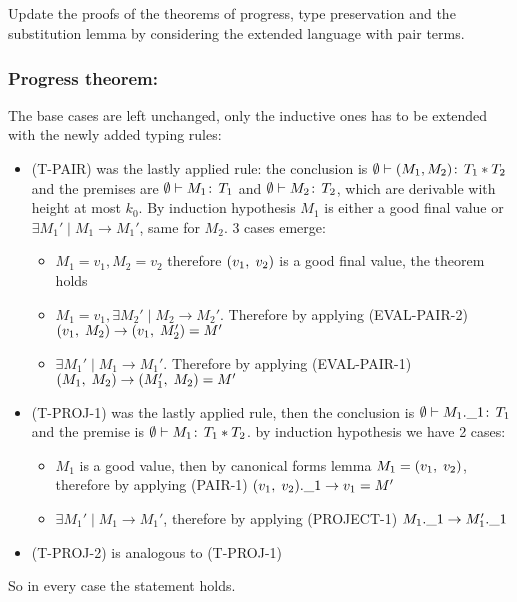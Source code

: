 \subsection{}
Update the proofs of the theorems of progress, type preservation and
the substitution lemma by considering the extended language with pair
terms.

\subsubsection*{Progress theorem:}

The base cases are left unchanged, only the inductive ones has to be
extended with the newly added typing rules:
\begin{itemize}
\item (T-PAIR) was the lastly applied rule: the conclusion is
  \(\emptyset \vdash (M_1, M_2) \!:\,T_1 * T_2\) and the premises
  are \(\emptyset \vdash M_1 \!:\,T_1\) and \(\emptyset \vdash M_2
  \!:\,T_2\), which are derivable with height at most \(k_0\). By
  induction hypothesis \(M_1\) is either a good final value or
  \(\exists M_1' \mid M_1 \to M_1'\), same for \(M_2\). 3 cases
  emerge:
  \begin{itemize}
  \item \(M_1 = v_1, M_2 = v_2\) therefore \((v_1,\;v_2)\) is a
    good final value, the theorem holds
  \item \(M_1 = v_1, \exists M_2'\mid M_2 \to M_2'\). Therefore by
    applying (EVAL-PAIR-2) \((v_1,\;M_2) \to (v_1,\;M_2') =
    M'\)
  \item \(\exists M_1'\mid M_1 \to M_1'\). Therefore by applying
    (EVAL-PAIR-1) \((M_1,\;M_2) \to (M_1',\;M_2) = M'\)
  \end{itemize}
\item (T-PROJ-1) was the lastly applied rule, then the conclusion is
  \(\emptyset \vdash M_1.\_1 \!:\,T_1\) and the premise is
  \(\emptyset \vdash M_1 \!:\,T_1 * T_2\). by induction hypothesis
  we have 2 cases:
  \begin{itemize}
  \item \(M_1\) is a good value, then by canonical forms lemma \(M_1 =
    (v_1,\;v_2)\), therefore by applying (PAIR-1)
    \((v_1,\;v_2).\_1 \to v_1 = M'\)
  \item \(\exists M_1' \mid M_1 \to M_1'\), therefore by applying
    (PROJECT-1) \(M_1.\_1 \to M_1'.\_1\)
  \end{itemize}
\item (T-PROJ-2) is analogous to (T-PROJ-1)
\end{itemize}
So in every case the statement holds.

